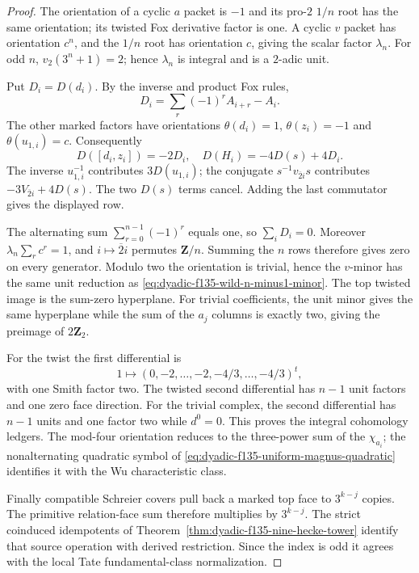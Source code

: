 \begin{proof}
The orientation of a cyclic
$a$ packet is $-1$ and its
pro-$2$ $1/n$ root has the
same orientation; its twisted
Fox derivative factor is one.
A cyclic $v$ packet has
orientation $c^n$, and the
$1/n$ root has orientation $c$,
giving the scalar factor
$\lambda_n$.
For odd $n$,
$v_2(3^n+1)=2$;
hence $\lambda_n$ is integral
and is a $2$-adic unit.

Put $D_i=D(d_i)$.
By the inverse and product
Fox rules,
\[
D_i=\sum_r(-1)^rA_{i+r}-A_i.
\]
The other marked factors have
orientations
$\theta(d_i)=1$,
$\theta(z_i)=-1$ and
$\theta(u_{1,i})=c$.
Consequently
\[
D([d_i,z_i])=-2D_i,
\quad
D(H_i)=-4D(s)+4D_i.
\]
The inverse $u_{1,i}^{-1}$
contributes $3D(u_{1,i})$;
the conjugate
$s^{-1}v_{\overline2 i}s$
contributes
$-3V_{\overline2 i}+4D(s)$.
The two $D(s)$ terms cancel.
Adding the last commutator
gives the displayed row.

The alternating sum
$\sum_{r=0}^{n-1}(-1)^r$
equals one, so
$\sum_iD_i=0$.
Moreover
$\lambda_n\sum_r c^r=1$,
and $i\mapsto\overline2 i$
permutes $\mathbf Z/n$.
Summing the $n$ rows
therefore gives zero
on every generator.
Modulo two the orientation
is trivial, hence the
$v$-minor has the same
unit reduction as
\eqref{eq:dyadic-f135-wild-n-minus1-minor}.
The top twisted image is
the sum-zero hyperplane.
For trivial coefficients,
the unit minor gives the
same hyperplane while the
sum of the $a_j$ columns
is exactly two, giving the
preimage of $2\mathbf Z_2$.

For the twist the first
differential is
\[
1\longmapsto
(0,-2,\ldots,-2,
-4/3,\ldots,-4/3)^t,
\]
with one Smith factor two.
The twisted second
differential has $n-1$
unit factors and one zero
face direction.  For the
trivial complex, the
second differential has
$n-1$ units and one
factor two while $d^0=0$.
This proves the integral
cohomology ledgers.
The mod-four orientation
reduces to the three-power
sum of the $\chi_{a_i}$;
the nonalternating quadratic
symbol of
\eqref{eq:dyadic-f135-uniform-magnus-quadratic}
identifies it with the
Wu characteristic class.

Finally compatible Schreier
covers pull back a marked
top face to $3^{k-j}$
copies.  The primitive
relation-face sum therefore
multiplies by $3^{k-j}$.
The strict coinduced
idempotents of
Theorem~\ref{thm:dyadic-f135-nine-hecke-tower}
identify that source
operation with derived
restriction.  Since the
index is odd it agrees
with the local Tate
fundamental-class
normalization.
\end{proof}

